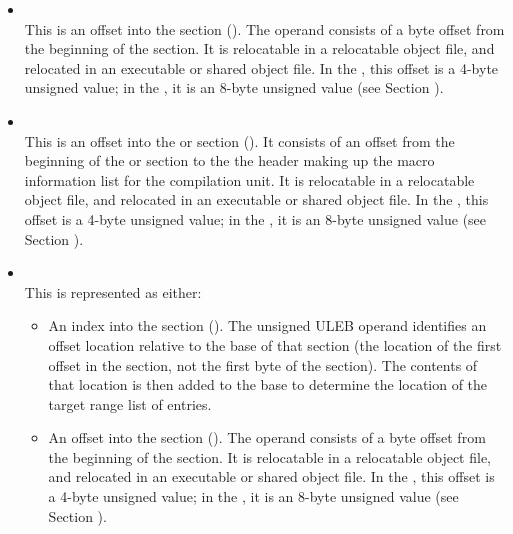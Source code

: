 \begin{itemize}
\item \CLASSloclistsptr \\
This is an offset into the \dotdebugloclists{} section (\DWFORMsecoffset). 
The operand consists of a byte 
offset
from the beginning of the \dotdebugloclists{} section.
It is relocatable in a relocatable object file, and
relocated in an executable or shared object file. In the 
\thirtytwobitdwarfformat, this offset is a 4-byte unsigned value;
in the \sixtyfourbitdwarfformat, it is an 8-byte unsigned value
(see Section ).

\item \CLASSmacptr \\
This is an 
offset into the 
\dotdebugmacro{} or \dotdebugmacrodwo{} section
(\DWFORMsecoffset). 
It consists of an offset from the beginning of the 
\dotdebugmacro{} or \dotdebugmacrodwo{} 
section to the the header making up the 
macro information list for the compilation unit. 
It is relocatable in a relocatable object file, and
relocated in an executable or shared object file. In the 
\thirtytwobitdwarfformat, this offset is a 4-byte unsigned value;
in the \sixtyfourbitdwarfformat, it is an 8-byte unsigned value
(see Section ).

\item \CLASSrnglist \\
This is represented as either:
\begin{itemize}
\item
An index into the \dotdebugrnglists{} section (\DWFORMrnglistxTARG). 
The unsigned ULEB operand identifies an offset location 
relative to the base of that section (the location of the first offset 
in the section, not the first byte of the section). The contents of 
that location is then added to the base to determine the location of 
the target range list of entries.
\item
An offset into the \dotdebugrnglists{} section (\DWFORMsecoffset). 
The operand consists of a byte 
offset
from the beginning of the \dotdebugrnglists{} section.
It is relocatable in a relocatable object file, and
relocated in an executable or shared object file. In the 
\thirtytwobitdwarfformat, this offset is a 4-byte unsigned value;
in the \sixtyfourbitdwarfformat, it is an 8-byte unsigned value
(see Section ).
\end{itemize}


\end{itemize}
